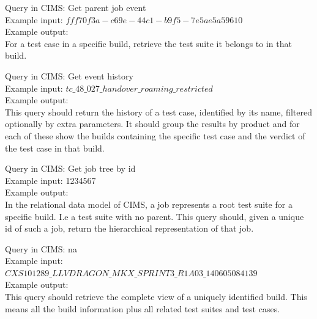 Query in CIMS: Get parent job event \\
Example input: $fff70f3a-c69e-44c1-b9f5-7e5ae5a59610$\\
Example output: \\
For a test case in a specific build, retrieve the test suite it belongs to in that build.

Query in CIMS: Get event history \\
Example input: $tc\_48\_027\_handover\_roaming\_restricted$\\
Example output: \\
This query should return the history of a test case, identified by its name, filtered optionally by extra parameters. It should group the results by product and for each of these show the builds containing the specific test case and the verdict of the test case in that build.

Query in CIMS: Get job tree by id \\
Example input: 1234567\\
Example output: \\
In the relational data model of CIMS, a job represents a root test suite for a specific build. I.e a test suite with no parent. This query should, given a unique id of such a job, return the hierarchical representation of that job.


Query in CIMS: na \\
Example input: $CXS101289\_LLVDRAGON\_MKX\_SPRINT3\_R1A03\_140605084139$ \\
Example output: \\
This query should retrieve the complete view of a uniquely identified build. This means all the build information plus all related test suites and test cases.



%
%
